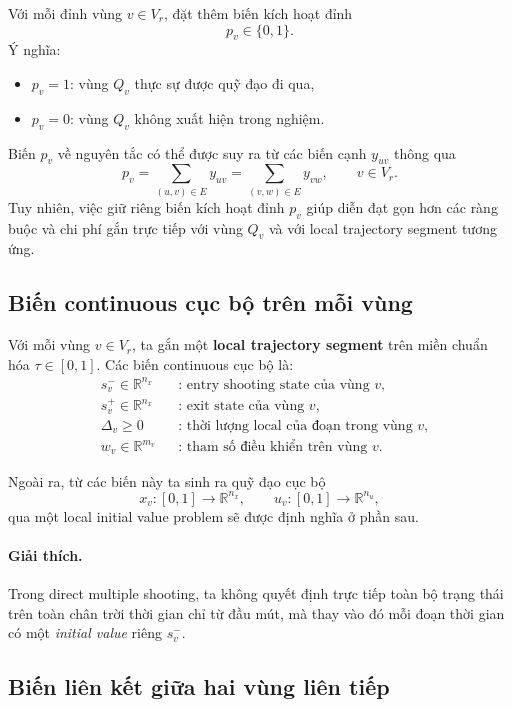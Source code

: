 \documentclass[12pt]{article}
\begin{document}
Với mỗi đỉnh vùng $v\in V_r$, đặt thêm biến kích hoạt đỉnh
\begin{equation}
p_v\in\{0,1\}.
\label{eq:pdef}
\end{equation}
Ý nghĩa:
\begin{itemize}
    \item $p_v=1$: vùng $Q_v$ thực sự được quỹ đạo đi qua,
    \item $p_v=0$: vùng $Q_v$ không xuất hiện trong nghiệm.
\end{itemize}


Biến $p_v$ về nguyên tắc có thể được suy ra từ các biến cạnh $y_{uv}$ thông qua
\[
p_v=\sum_{(u,v)\in E} y_{uv}=\sum_{(v,w)\in E} y_{vw}, \qquad v\in V_r.
\]
Tuy nhiên, việc giữ riêng biến kích hoạt đỉnh $p_v$ giúp diễn đạt gọn hơn các ràng buộc và chi phí gắn trực tiếp với vùng $Q_v$ và với local trajectory segment tương ứng.


\subsection{Biến continuous cục bộ trên mỗi vùng}

Với mỗi vùng $v\in V_r$, ta gắn một \textbf{local trajectory segment} trên miền chuẩn hóa $\tau\in[0,1]$. Các biến continuous cục bộ là:
\begin{align}
& s_v^- \in \mathbb R^{n_x} && \text{: entry shooting state của vùng } v, \nonumber\\
& s_v^+ \in \mathbb R^{n_x} && \text{: exit state của vùng } v, \nonumber\\
& \Delta_v \ge 0 && \text{: thời lượng local của đoạn trong vùng } v, \nonumber\\
& w_v \in \mathbb R^{m_v} && \text{: tham số điều khiển trên vùng } v. \nonumber
\end{align}

Ngoài ra, từ các biến này ta sinh ra quỹ đạo cục bộ
\[
x_v:[0,1]\to\mathbb R^{n_x},
\qquad
u_v:[0,1]\to\mathbb R^{n_u},
\]
qua một local initial value problem sẽ được định nghĩa ở phần sau.

\paragraph{Giải thích.}
Trong direct multiple shooting, ta không quyết định trực tiếp toàn bộ trạng thái trên toàn chân trời thời gian chỉ từ đầu mút, mà thay vào đó mỗi đoạn thời gian có một \emph{ initial value} riêng $s_v^-$.

\subsection{Biến liên kết giữa hai vùng liên tiếp}
\end{document}
